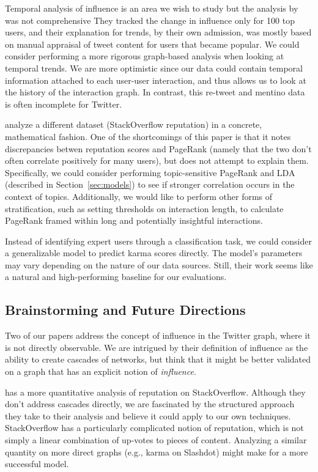\documentclass[10pt]{article}
\begin{document}
Temporal analysis of influence is an area we wish to study but
the analysis by \citet{cha2010measuring} was not comprehensive
They tracked the change in influence only for 100 top users, and
their explanation for trends, by their own admission, was mostly 
based on manual appraisal of tweet content for users that became popular.
We could consider performing a more rigorous graph-based analysis when looking at temporal
trends. We are more optimistic since our data
could contain temporal information attached to each user-user interaction,
and thus allows us to look at the history of the interaction graph. In contrast, this
re-tweet and mentino data is often incomplete for Twitter.

\citet{movshovitzanalysis} analyze a different dataset (StackOverflow
reputation) in a concrete, mathematical fashion.  One of the shortcomings of
this paper is that it notes discrepancies betwen reputation scores and PageRank
(namely that the two don't often correlate positively for many users), but does
not attempt to explain them. Specifically, we could consider performing
topic-sensitive PageRank and LDA (described in Section~\ref{sec:models}) to see
if stronger correlation occurs in the context of topics.  Additionally, we would
like to perform other forms of stratification, such as setting thresholds on
interaction length, to calculate PageRank framed within long and potentially
insightful interactions.

Instead of identifying expert users through a classification task, we could
consider a generalizable model to predict karma scores directly. The model's
parameters may vary depending on the nature of our data sources. Still, their
work seems like a natural and high-performing baseline for our evaluations. 

\subsection{Brainstorming and Future Directions}

Two of our papers address the concept of influence in the Twitter graph, where
it is not directly observable. We are intrigued by their definition of influence
as the ability to create cascades of networks, but think that it might be better
validated on a graph that has an explicit notion of \textit{influence}.

\citet{movshovitzanalysis} has a more quantitative analysis of reputation on
StackOverflow.  Although they don't address cascades directly, we are fascinated 
by the structured approach they take to their analysis and believe it could apply
to our own techniques.  StackOverflow has a particularly complicated
notion of reputation, which is not simply a linear combination of up-votes to
pieces of content. Analyzing a similar quantity on more direct graphs (e.g.,
karma on Slashdot) might make for a more successful model.
\end{document}
